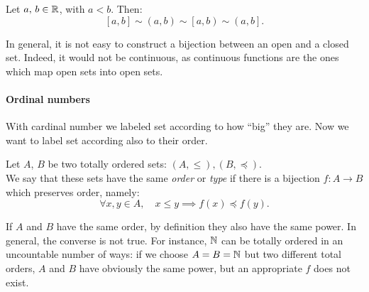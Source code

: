 \begin{prop}\label{prop-RR-open-intervals-equipotent-closed-intervals}
	Let $a,\,b \in \mathbb R$, with $a<b$. Then:
	$$\left[a,b\right]\sim\left(a,b\right)\sim\left[a,b\right)\sim\left(a,b\right].$$
\end{prop}
	
In general, it is not easy to construct a bijection between an open and a closed set. Indeed, it would not be continuous, as continuous functions are the ones which map open sets into open sets.

\paragraph{Ordinal numbers}

With cardinal number we labeled set according to how ``big'' they are. Now we want to label set according also to their order.

\begin{defn}
	Let $A$, $B$ be two totally ordered sets: $(A, \le), (B, \preceq)$. \\
	We say that these sets have the same \emph{order} or \emph{type} if there is a bijection $f : A \to B$ which preserves order, namely:
	$$\forall x,y \in A, \quad x \le y \implies f(x) \preceq f(y).$$
\end{defn}

If $A$ and $B$ have the same order, by definition they also have the same power. In general, the converse is not true. For instance, $\mathbb N$ can be totally ordered in an uncountable number of ways: if we choose $A = B = \mathbb N$ but two different total orders, $A$ and $B$ have obviously the same power, but an appropriate $f$ does not exist.

